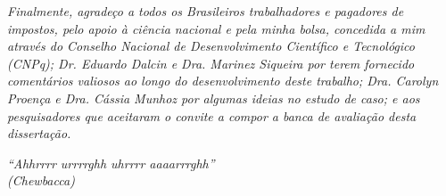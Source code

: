 \documentclass[
	12pt,				%
	openright,			%
	oneside,			%
	a4paper,			%
	sumario=tradicional,%
	french,				%
	spanish,			%
	brazil,				%
    english
	]{abntex2}
\begin{document}
\begin{agradecimentos}
\begin{footnotesize}
\textit{Finalmente, agradeço a todos os Brasileiros trabalhadores e pagadores de impostos, pelo apoio à ciência nacional e pela minha bolsa, concedida a mim através do Conselho Nacional de Desenvolvimento Científico e Tecnológico (CNPq); Dr. Eduardo Dalcin e Dra. Marinez Siqueira por terem fornecido comentários valiosos ao longo do desenvolvimento deste trabalho; Dra. Carolyn Proença e Dra. Cássia Munhoz por algumas ideias no estudo de caso; e aos pesquisadores que aceitaram o convite a compor a banca de avaliação desta dissertação.}
\end{footnotesize}

\end{agradecimentos}

\begin{epigrafe}
    \vspace*{\fill}
	\begin{flushright}
		\textit{``Ahhrrrr urrrrghh uhrrrr aaaarrrghh''\\
		(Chewbacca)}
	\end{flushright}
\end{epigrafe}

\end{document}
